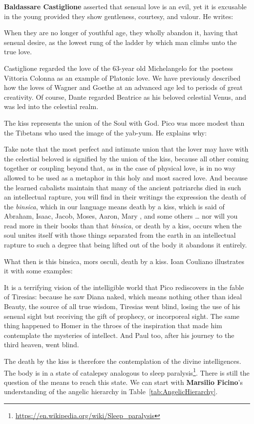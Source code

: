 \textbf{Baldassare Castiglione} asserted that sensual love is an evil, yet it is excusable in the young provided they show gentleness, courtesy, and valour. He writes:

\begin{quotex}
When they are no longer of youthful age, they wholly abandon it, having that sensual desire, as the lowest rung of the ladder by which man climbs unto the true love. 

\end{quotex}
Castiglione regarded the love of the 63-year old Michelangelo for the poetess Vittoria Colonna as an example of Platonic love. We have previously described how the loves of Wagner and Goethe at an advanced age led to periods of great creativity. Of course, Dante regarded Beatrice as his beloved celestial Venus, and was led into the celestial realm.

The kiss represents the union of the Soul with God. Pico was more modest than the Tibetans who used the image of the yab-yum. He explains why:

\begin{quotex}
Take note that the most perfect and intimate union that the lover may have with the celestial beloved is signified by the union of the kiss, because all other coming together or coupling beyond that, as in the case of physical love, is in no way allowed to be used as a metaphor in this holy and most sacred love. And because the learned cabalists maintain that many of the ancient patriarchs died in such an intellectual rapture, you will find in their writings the expression the death of the \emph{binsica}, which in our language means death by a kiss, which is said of Abraham, Isaac, Jacob, Moses, Aaron, Mary , and some others … nor will you read more in their books than that \emph{binsica}, or death by a kiss, occurs when the soul unites itself with those things separated from the earth in an intellectual rapture to such a degree that being lifted out of the body it abandons it entirely. 

\end{quotex}
What then is this binsica, mors osculi, death by a kiss. Ioan Couliano illustrates it with some examples:

\begin{quotex}
It is a terrifying vision of the intelligible world that Pico rediscovers in the fable of Tiresias: because he saw Diana naked, which means nothing other than ideal Beauty, the source of all true wisdom, Tiresias went blind, losing the use of his sensual sight but receiving the gift of prophecy, or incorporeal sight. The same thing happened to Homer in the throes of the inspiration that made him contemplate the mysteries of intellect. And Paul too, after his journey to the third heaven, went blind. 

\end{quotex}
The death by the kiss is therefore the contemplation of the divine intelligences. The body is in a state of catalepsy analogous to sleep paralysis\footnote{\url{https://en.wikipedia.org/wiki/Sleep_paralysis}}. There is still the question of the means to reach this state. We can start with \textbf{Marsilio Ficino}'s understanding of the angelic hierarchy in Table~\ref{tab:AngelicHierarchy}.

